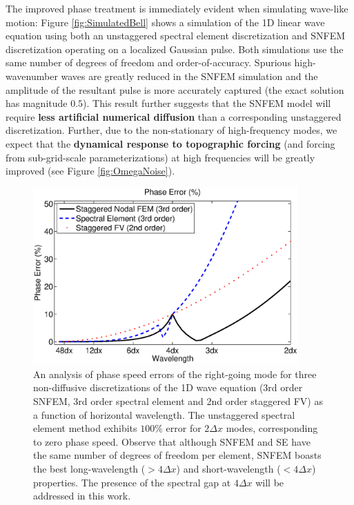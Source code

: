 \documentclass[11pt]{article}
\begin{document}
The improved phase treatment is immediately evident when simulating wave-like motion:  Figure \ref{fig:SimulatedBell} shows a simulation of the 1D linear wave equation using both an unstaggered spectral element discretization and SNFEM discretization operating on a localized Gaussian pulse.  Both simulations use the same number of degrees of freedom and order-of-accuracy.  Spurious high-wavenumber waves are greatly reduced in the SNFEM simulation and the amplitude of the resultant pulse is more accurately captured (the exact solution has magnitude $0.5$).  This result further suggests that the SNFEM model will require \textbf{less artificial numerical diffusion} than a corresponding unstaggered discretization.  Further, due to the non-stationary of high-frequency modes, we expect that the \textbf{dynamical response to topographic forcing} (and forcing from sub-grid-scale parameterizations) at high frequencies will be greatly improved (see Figure \ref{fig:OmegaNoise}). 

\begin{figure}
\begin{center}
\includegraphics[width=4in, clip=true, trim=0cm 0.1cm 0cm 0.1cm]{PhaseErrors}
\end{center}
\caption{An analysis of phase speed errors of the right-going mode for three non-diffusive discretizations of the 1D wave equation (3rd order SNFEM, 3rd order spectral element and 2nd order staggered FV) as a function of horizontal wavelength.  The unstaggered spectral element method exhibits $100\%$ error for $2 \Delta x$ modes, corresponding to zero phase speed.  Observe that although SNFEM and SE have the same number of degrees of freedom per element, SNFEM boasts the best long-wavelength ($> 4 \Delta x$) and short-wavelength ($< 4 \Delta x$) properties.  The presence of the spectral gap at $4 \Delta x$ will be addressed in this work.} \label{fig:SNFEMEigenstructure}
\end{figure}
\end{document}
